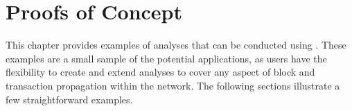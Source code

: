 \chapter{Proofs of Concept}\label{ch:pocs}

This chapter provides examples of analyses that can be conducted using
\iblock{}. These examples are a small sample of the potential applications, as
users have the flexibility to create and extend analyses to cover any aspect of
block and transaction propagation within the network. The following sections
illustrate a few straightforward examples.



